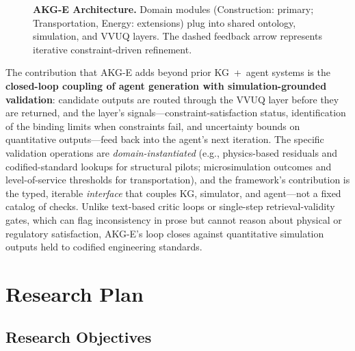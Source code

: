 \documentclass[conference, 10pt]{IEEEtran}
\begin{document}
\begin{figure}[t]
{
    }%
    \caption{\textbf{AKG-E Architecture.} Domain modules (Construction: primary; Transportation, Energy: extensions) plug into shared ontology, simulation, and VVUQ layers. The dashed feedback arrow represents iterative constraint-driven refinement.}
    \label{fig:framework}
    \vspace{-0.5em}
\end{figure}

The contribution that AKG-E adds beyond prior KG~+~agent systems is the \textbf{closed-loop coupling of agent generation with simulation-grounded validation}: candidate outputs are routed through the VVUQ layer before they are returned, and the layer's signals---constraint-satisfaction status, identification of the binding limits when constraints fail, and uncertainty bounds on quantitative outputs---feed back into the agent's next iteration. The specific validation operations are \textit{domain-instantiated} (e.g., physics-based residuals and codified-standard lookups for structural pilots; microsimulation outcomes and level-of-service thresholds for transportation), and the framework's contribution is the typed, iterable \textit{interface} that couples KG, simulator, and agent---not a fixed catalog of checks. Unlike text-based critic loops or single-step retrieval-validity gates, which can flag inconsistency in prose but cannot reason about physical or regulatory satisfaction, AKG-E's loop closes against quantitative simulation outputs held to codified engineering standards.

\section{Research Plan}

\subsection{Research Objectives}
\end{document}
